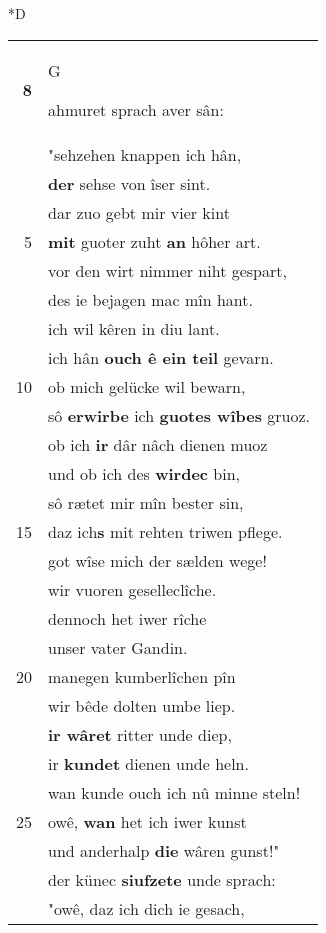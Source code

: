 \documentclass[8pt,a4paper,notitlepage]{article}
\begin{document}
\begin{table}[ht]
\begin{minipage}[t]{0.5\linewidth}
\small
\begin{center}*D
\end{center}
\begin{tabular}{rl}
\textbf{8} & \begin{large}G\end{large}ahmuret sprach aver sân:\\ 
 & "sehzehen knappen ich hân,\\ 
 & \textbf{der} sehse von îser sint.\\ 
 & dar zuo gebt mir vier kint\\ 
5 & \textbf{mit} guoter zuht \textbf{an} hôher art.\\ 
 & vor den wirt nimmer niht gespart,\\ 
 & des ie bejagen mac mîn hant.\\ 
 & ich wil kêren in diu lant.\\ 
 & ich hân \textbf{ouch ê ein teil} gevarn.\\ 
10 & ob mich gelücke wil bewarn,\\ 
 & sô \textbf{erwirbe} ich \textbf{guotes wîbes} gruoz.\\ 
 & ob ich \textbf{ir} dâr nâch dienen muoz\\ 
 & und ob ich des \textbf{wirdec} bin,\\ 
 & sô rætet mir mîn bester sin,\\ 
15 & daz ich\textbf{s} mit rehten triwen pflege.\\ 
 & got wîse mich der sælden wege!\\ 
 & wir vuoren geselleclîche.\\ 
 & dennoch het iwer rîche\\ 
 & unser vater Gandin.\\ 
20 & manegen kumberlîchen pîn\\ 
 & wir bêde dolten umbe liep.\\ 
 & \textbf{ir wâret} ritter unde diep,\\ 
 & ir \textbf{kundet} dienen unde heln.\\ 
 & wan kunde ouch ich nû minne steln!\\ 
25 & owê, \textbf{wan} het ich iwer kunst\\ 
 & und anderhalp \textbf{die} wâren gunst!"\\ 
 & der künec \textbf{siufzete} unde sprach:\\ 
 & "owê, daz ich dich ie gesach,\\ 

\end{tabular}
\end{minipage}
\end{table}
\end{document}
